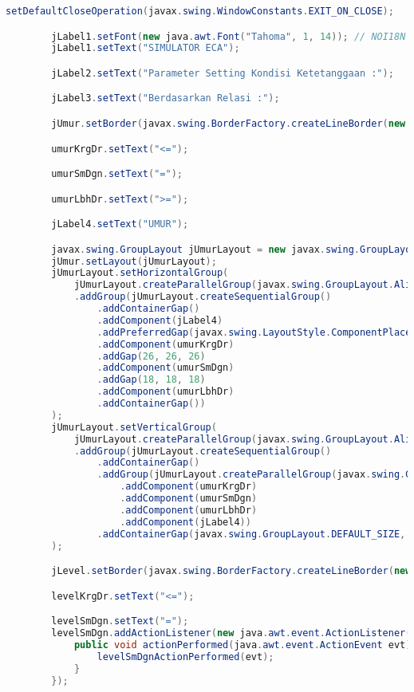 \begin{lstlisting}[language=Java, caption=TampilanKondisiKetetanggaan.java]
        setDefaultCloseOperation(javax.swing.WindowConstants.EXIT_ON_CLOSE);

        jLabel1.setFont(new java.awt.Font("Tahoma", 1, 14)); // NOI18N
        jLabel1.setText("SIMULATOR ECA");

        jLabel2.setText("Parameter Setting Kondisi Ketetanggaan :");

        jLabel3.setText("Berdasarkan Relasi :");

        jUmur.setBorder(javax.swing.BorderFactory.createLineBorder(new java.awt.Color(0, 0, 0)));

        umurKrgDr.setText("<=");

        umurSmDgn.setText("=");

        umurLbhDr.setText(">=");

        jLabel4.setText("UMUR");

        javax.swing.GroupLayout jUmurLayout = new javax.swing.GroupLayout(jUmur);
        jUmur.setLayout(jUmurLayout);
        jUmurLayout.setHorizontalGroup(
            jUmurLayout.createParallelGroup(javax.swing.GroupLayout.Alignment.LEADING)
            .addGroup(jUmurLayout.createSequentialGroup()
                .addContainerGap()
                .addComponent(jLabel4)
                .addPreferredGap(javax.swing.LayoutStyle.ComponentPlacement.RELATED, javax.swing.GroupLayout.DEFAULT_SIZE, Short.MAX_VALUE)
                .addComponent(umurKrgDr)
                .addGap(26, 26, 26)
                .addComponent(umurSmDgn)
                .addGap(18, 18, 18)
                .addComponent(umurLbhDr)
                .addContainerGap())
        );
        jUmurLayout.setVerticalGroup(
            jUmurLayout.createParallelGroup(javax.swing.GroupLayout.Alignment.LEADING)
            .addGroup(jUmurLayout.createSequentialGroup()
                .addContainerGap()
                .addGroup(jUmurLayout.createParallelGroup(javax.swing.GroupLayout.Alignment.BASELINE)
                    .addComponent(umurKrgDr)
                    .addComponent(umurSmDgn)
                    .addComponent(umurLbhDr)
                    .addComponent(jLabel4))
                .addContainerGap(javax.swing.GroupLayout.DEFAULT_SIZE, Short.MAX_VALUE))
        );

        jLevel.setBorder(javax.swing.BorderFactory.createLineBorder(new java.awt.Color(0, 0, 0)));

        levelKrgDr.setText("<=");

        levelSmDgn.setText("=");
        levelSmDgn.addActionListener(new java.awt.event.ActionListener() {
            public void actionPerformed(java.awt.event.ActionEvent evt) {
                levelSmDgnActionPerformed(evt);
            }
        });


\end{lstlisting}
